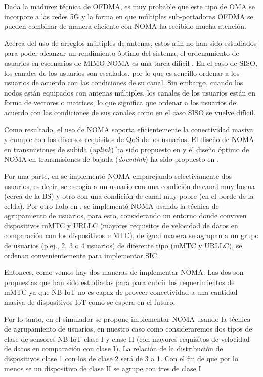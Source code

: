 Dada la madurez técnica de OFDMA, es muy probable que este tipo de OMA se incorpore a las redes 5G \parencite{DIng2017} y la forma en que múltiples sub-portadoras OFDMA se pueden combinar de manera eficiente con NOMA ha recibido mucha atención.

Acerca del uso de arreglos múltiples de antenas, estos aún no han sido estudiados para poder alcanzar un rendimiento óptimo del sistema, el ordenamiento de usuarios en escenarios de MIMO-NOMA es una tarea difícil \parencite{DIng2017}. En el caso de SISO, los canales de los usuarios son escalados, por lo que es sencillo ordenar a los usuarios de acuerdo con las condiciones de su canal. Sin embargo, cuando los nodos están equipados con antenas múltiples, los canales de los usuarios están en forma de vectores o matrices, lo que significa que ordenar a los usuarios de acuerdo con las condiciones de sus canales como en el caso SISO se vuelve difícil. 

Como resultado, el uso de NOMA soporta eficientemente la conectividad masiva y cumple con los diversos requisitos de QoS de los usuarios. El diseño de NOMA en transmisiones de subida (\textit{uplink}) ha sido propuesto en \parencite{Al-Imari2014} y el diseño óptimo de NOMA en transmisiones de bajada (\textit{downlink}) ha sido propuesto en \parencite{Zhu2019}.

Por una parte, en \parencite{Zhang2017} se implementó NOMA emparejando selectivamente dos usuarios, es decir, se escogía a un usuario con una condición de canal muy buena (cerca de la BS) y otro con una condición de canal muy pobre (en el borde de la celda). Por otro lado en \parencite{Shahini2019}, se implementó NOMA usando la técnica de agrupamiento de usuarios, para esto, considerando un entorno donde conviven dispositivos mMTC y URLLC (mayores requisitos de velocidad de datos en comparación con los dispositivos mMTC), de igual manera se agrupan a un grupo de usuarios (p.ej., 2, 3 o 4 usuarios) de diferente tipo (mMTC y URLLC), se ordenan convenientemente para implementar SIC.

Entonces, como vemos hay dos maneras de implementar NOMA. Las dos son propuestas que han sido estudiadas para para cubrir los requerimientos de mMTC ya que NB-IoT no es capaz de proveer conectividad a una cantidad masiva de dispositivos IoT como se espera en el futuro.

Por lo tanto, en el simulador se propone implementar NOMA usando la técnica de agrupamiento de usuarios, en nuestro caso como consideraremos dos tipos de clase de sensores NB-IoT clase I y clase II (con mayores requisitos de velocidad de datos en comparación con clase I). La relación de la distribución de dispositivos clase 1 con los de clase 2 será de 3 a 1. Con el fin de que por lo menos se un dispositivo de clase II se agrupe con tres de clase I.

